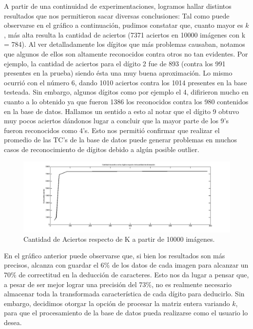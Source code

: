 \documentclass[10pt, a4paper]{article}
\begin{document}
A partir de una continuidad de experimentaciones, logramos hallar distintos resultados que nos permitieron sacar diversas conclusiones:\newline
Tal como puede observarse en el gráfico a continuación, pudimos constatar que, cuanto mayor es $k$, más alta resulta la cantidad de aciertos (7371 aciertos en 10000 imágenes con k = 784). Al ver detalladamente los dígitos que más problemas causaban, notamos que algunos de ellos son altamente reconocidos contra otros no tan evidentes. Por ejemplo, la cantidad de aciertos para el dígito 2 fue de 893 (contra los 991 presentes en la prueba) siendo ésta una muy buena aproximación. Lo mismo ocurrió con el número 6, dando 1010 aciertos contra los 1014 presentes en la base testeada. Sin embargo, algunos dí­gitos como por ejemplo el 4, difirieron mucho en cuanto a lo obtenido ya que fueron 1386 los reconocidos contra los 980 contenidos en la base de datos. Hallamos un sentido a esto al notar que el dígito 9 obtuvo muy pocos aciertos dándonos lugar a concluir que la mayor parte de los 9's fueron reconocidos como 4's. Esto nos permitió confirmar que realizar el promedio de las TC's de la base de datos puede generar problemas en muchos casos de reconocimiento de dígitos debido a algún posible outlier.\newline

\begin{figure}[H] %
\begin{center}
\includegraphics[width=540pt]{../imgs/aciertosconk.jpg}
\caption[h]{Cantidad de Aciertos respecto de K a partir de 10000 imágenes.}
\end{center}
\end{figure}

En el gráfico anterior puede observarse que, si bien los resultados son más precisos, alcanza con guardar el 6\% de los datos de cada imagen para alcanzar un 70\% de correctitud en la deducción de caracteres. Esto nos da lugar a pensar que, a pesar de ser mejor lograr una precisión del 73\%, no es realmente necesario almacenar toda la transformada característica de cada dí­gito para deducirlo. Sin embargo, decidimos otorgar la opción de procesar la matriz entera variando $k$, para que el procesamiento de la base de datos pueda realizarse como el usuario lo desea. 
\end{document}

